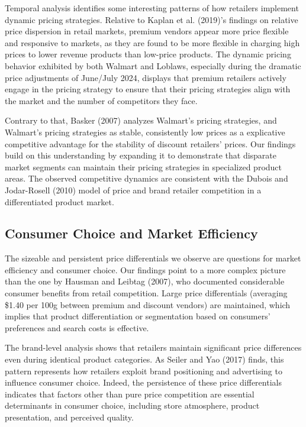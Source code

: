 \documentclass[
  letterpaper,
  DIV=11,
  numbers=noendperiod]{scrartcl}
\begin{document}
Temporal analysis identifies some interesting patterns of how retailers
implement dynamic pricing strategies. Relative to Kaplan et al. (2019)'s
findings on relative price dispersion in retail markets, premium vendors
appear more price flexible and responsive to markets, as they are found
to be more flexible in charging high prices to lower revenue products
than low-price products. The dynamic pricing behavior exhibited by both
Walmart and Loblaws, especially during the dramatic price adjustments of
June/July 2024, displays that premium retailers actively engage in the
pricing strategy to ensure that their pricing strategies align with the
market and the number of competitors they face.

Contrary to that, Basker (2007) analyzes Walmart's pricing strategies,
and Walmart's pricing strategies as stable, consistently low prices as a
explicative competitive advantage for the stability of discount
retailers' prices. Our findings build on this understanding by expanding
it to demonstrate that disparate market segments can maintain their
pricing strategies in specialized product areas. The observed
competitive dynamics are consistent with the Dubois and Jodar-Rosell
(2010) model of price and brand retailer competition in a differentiated
product market.

\subsection{Consumer Choice and Market
Efficiency}\label{consumer-choice-and-market-efficiency}

The sizeable and persistent price differentials we observe are questions
for market efficiency and consumer choice. Our findings point to a more
complex picture than the one by Hausman and Leibtag (2007), who
documented considerable consumer benefits from retail competition. Large
price differentials (averaging \$1.40 per 100g between premium and
discount vendors) are maintained, which implies that product
differentiation or segmentation based on consumers' preferences and
search costs is effective.

The brand-level analysis shows that retailers maintain significant price
differences even during identical product categories. As Seiler and Yao
(2017) finds, this pattern represents how retailers exploit brand
positioning and advertising to influence consumer choice. Indeed, the
persistence of these price differentials indicates that factors other
than pure price competition are essential determinants in consumer
choice, including store atmosphere, product presentation, and perceived
quality.
\end{document}
